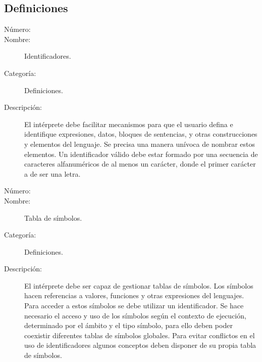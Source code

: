 \subsection{Definiciones}

	\begin{description}
		\item [Número:] \cn
		\item [Nombre:] Identificadores.
		\item [Categoría:] Definiciones.
		\item [Descripción:]  El intérprete debe facilitar mecanismos para que el usuario defina e identifique expresiones, datos, bloques de sentencias, y
		otras construcciones y elementos del lenguaje. Se precisa una manera unívoca de nombrar estos elementos. Un identificador válido debe estar
		formado por una secuencia de caracteres alfanuméricos de al menos un carácter, donde el primer carácter a de ser una letra.
	\end {description}

	\begin{description}
		\item [Número:] \cn
		\item [Nombre:] Tabla de símbolos.
		\item [Categoría:] Definiciones.
		\item [Descripción:] El intérprete debe ser capaz de gestionar tablas de símbolos. Los símbolos
		hacen referencias a valores, funciones y otras expresiones del lenguajes. Para acceder a estos símbolos
		se debe utilizar un identificador. Se hace necesario el acceso y uso de los símbolos según el contexto
		de ejecución, determinado por el ámbito y el tipo símbolo, para ello deben poder coexistir diferentes
		tablas de símbolos globales. Para evitar conflictos en el uso de identificadores algunos conceptos 
      deben disponer de su propia tabla de símbolos.
		
	\end {description}

